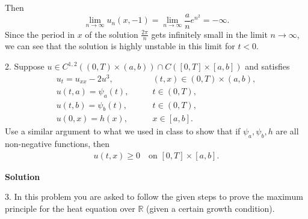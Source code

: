 \documentclass{article}
\begin{document}
Then
%
\begin{equation*}
    \lim_{n \to \infty} u_n(x, -1)
        = \lim_{n \to \infty} \frac{a}{n} e^{n^2}
        = - \infty
    .
\end{equation*}
%
Since the period in $x$ of the solution $\frac{2 \pi}{n}$ gets
infinitely small in the limit $n \to \infty$, we can see that the
solution is highly unstable in this limit for $t < 0$.

\newpage

2. Suppose
$u \in C^{1, 2}((0, T) \times (a, b)) \cap C([0, T] \times [a, b])$ and satisfies
%
\begin{align*}
    u_t = u_{xx} - 2u^3, &\qquad (t, x) \in (0, T) \times (a, b), \\
    u(t, a) = \psi_a(t), &\qquad t \in (0, T), \\
    u(t, b) = \psi_b(t), &\qquad t \in (0, T), \\
    u(0, x) = h(x), &\qquad x \in [a, b].
\end{align*}
%
Use a similar argument to what we used in class to show that if
$\psi_a, \psi_b, h$ are all non-negative functions, then
%
\begin{align*}
    u(t, x) \geq 0 \quad \text{on } [0, T] \times [a, b]
    .
\end{align*}

\textbf{Solution}

\newpage

3. In this problem you are asked to follow the given steps to prove the
maximum principle for the heat equation over $\mathbb{R}$ (given a
certain growth condition).
\end{document}
